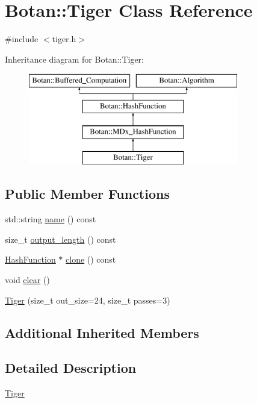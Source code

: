 \hypertarget{classBotan_1_1Tiger}{\section{Botan\-:\-:Tiger Class Reference}
\label{classBotan_1_1Tiger}
}


{\ttfamily \#include $<$tiger.\-h$>$}

Inheritance diagram for Botan\-:\-:Tiger\-:\begin{figure}[H]
\begin{center}
\leavevmode
\includegraphics[height=4.000000cm]{classBotan_1_1Tiger}
\end{center}
\end{figure}
\subsection*{Public Member Functions}
\begin{DoxyCompactItemize}
\item 
std\-::string \hyperlink{classBotan_1_1Tiger_ab839b8a5269cc3aa4810854357eb3729}{name} () const 
\item 
size\-\_\-t \hyperlink{classBotan_1_1Tiger_aca5a97a223654bfa95b16d2b4cc89148}{output\-\_\-length} () const 
\item 
\hyperlink{classBotan_1_1HashFunction}{Hash\-Function} $\ast$ \hyperlink{classBotan_1_1Tiger_ab77a25d5b3e4b3de08ab9cda3209d21f}{clone} () const 
\item 
void \hyperlink{classBotan_1_1Tiger_a7e693e97cf2c5e96b04febcf0e8c6399}{clear} ()
\item 
\hyperlink{classBotan_1_1Tiger_a78dafddbd8b47927abdc49f4723af753}{Tiger} (size\-\_\-t out\-\_\-size=24, size\-\_\-t passes=3)
\end{DoxyCompactItemize}
\subsection*{Additional Inherited Members}


\subsection{Detailed Description}
\hyperlink{classBotan_1_1Tiger}{Tiger} 

